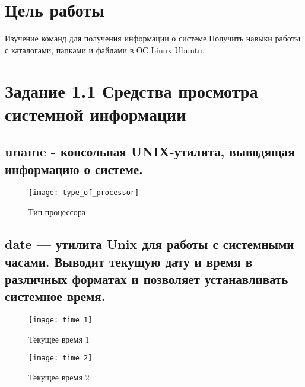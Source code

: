 







\section{Цель работы}
Изучение команд для получения информации о системе.Получить навыки работы с каталогами, папками и файлами в ОС Linux Ubuntu. 


\section{Задание 1.1 Средства просмотра системной информации}

\subsection{uname - консольная UNIX-утилита, выводящая информацию о системе.}

\begin{figure}[H]
	\begin{center}
		\texttt{[image: type\_of\_processor]}
		\caption{Тип процессора} 
		\label{pic:pic_1} %
	\end{center}
\end{figure}

\newpage

\subsection{date — утилита Unix для работы с системными часами. Выводит текущую дату и время в различных форматах и позволяет устанавливать системное время.}

\begin{figure}[H]
	\begin{center}
		\texttt{[image: time\_1]}
		\caption{Текущее время 1} 
		\label{pic:pic_2} %
	\end{center}
\end{figure}

\begin{figure}[H]
	\begin{center}
		\texttt{[image: time\_2]}
		\caption{Текущее время 2} 
		\label{pic:pic_3} %
	\end{center}
\end{figure}

